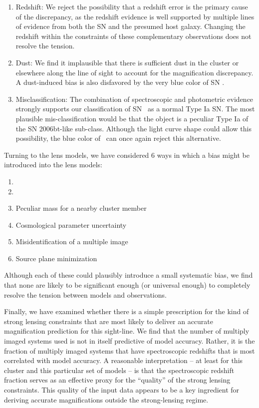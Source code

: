 \begin{enumerate}
\item Redshift: We reject the possibility that a redshift error is the primary cause
of the discrepancy, as the redshift evidence is well supported by
multiple lines of evidence from both the SN and the presumed host
galaxy. Changing the redshift within the constraints of these
complementary observations does not resolve the tension. 
\item Dust: We find
it implausible that there is sufficient dust in the cluster or
elsewhere along the line of sight to account for the magnification
discrepancy.  A dust-induced bias is also disfavored by the very blue
color of SN \tomas.
\item Misclassification: The combination of spectroscopic and
photometric evidence strongly supports our classification of
SN \tomas\ as a normal Type Ia SN.  The most plausible
mis-classification would be that the object is a peculiar Type Ia of
the SN 2006bt-like sub-class.  Although the light curve shape could
allow this possibility, the blue color of \tomas\ can once again
reject this alternative. 
\end{enumerate}

\noindent 

Turning to the lens models, we have considered 6 ways in which a bias
might be introduced into the lens models:

\begin{enumerate}
\item {}
\item {}
\item Peculiar mass for a nearby cluster member
\item Cosmological parameter uncertainty
\item Misidentification of a multiple image
\item Source plane minimization
\end{enumerate}

\noindent
Although each of these could plausibly introduce a small systematic
bias, we find that none are likely to be significant enough (or
universal enough) to completely resolve the tension between models and
observations.  

Finally, we have examined whether there is a simple prescription for
the kind of strong lensing constraints that are most likely to deliver
an accurate magnification prediction for this sight-line.  We find
that the number of multiply imaged systems used is not in itself
predictive of model accuracy.  Rather, it is the fraction of multiply
imaged systems that have spectroscopic redshifts that is most
correlated with model accuracy.  A reasonable interpretation -- at
least for this cluster and this particular set of models -- is that
the spectroscopic redshift fraction serves as an effective proxy for
the ``quality'' of the strong lensing constraints. This quality of the
input data appears to be a key ingredient for deriving accurate
magnifications outside the strong-lensing regime.

